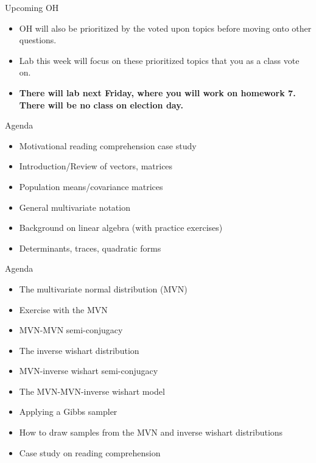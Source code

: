 \documentclass[
  ignorenonframetext,
]{beamer}
\providecommand{\tightlist}{%
  \setlength{\itemsep}{0pt}\setlength{\parskip}{0pt}}
\begin{document}
\begin{frame}{Upcoming OH}
\protect\hypertarget{upcoming-oh}{}

\begin{itemize}
\tightlist
\item
  OH will also be prioritized by the voted upon topics before moving
  onto other questions.
\item
  Lab this week will focus on these prioritized topics that you as a
  class vote on.
\item
  \textbf{There will lab next Friday, where you will work on homework 7. There will be no class on election day.}
\end{itemize}

\end{frame}

\begin{frame}{Agenda}
\protect\hypertarget{agenda}{}

\begin{itemize}
\tightlist
\item
  Motivational reading comprehension case study
\item
  Introduction/Review of vectors, matrices
\item
  Population means/covariance matrices
\item
  General multivariate notation
\item
  Background on linear algebra (with practice exercises)
\item
  Determinants, traces, quadratic forms
\end{itemize}

\end{frame}

\begin{frame}{Agenda}
\protect\hypertarget{agenda-1}{}

\begin{itemize}
\tightlist
\item
  The multivariate normal distribution (MVN)
\item
  Exercise with the MVN
\item
  MVN-MVN semi-conjugacy
\item
  The inverse wishart distribution
\item
  MVN-inverse wishart semi-conjugacy
\item
  The MVN-MVN-inverse wishart model
\item
  Applying a Gibbs sampler
\item
  How to draw samples from the MVN and inverse wishart distributions
\item
  Case study on reading comprehension
\end{itemize}

\end{frame}
\end{document}

